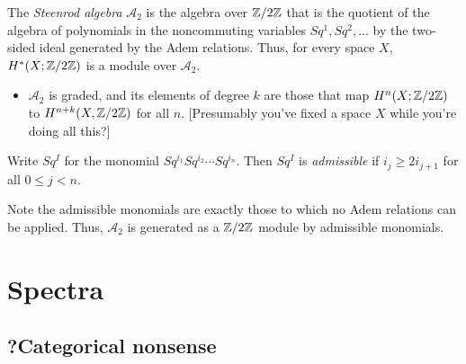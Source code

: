 \documentclass{MetricNotes2023}
\def\inte{\ensuremath\mathbb{Z}}
\def\A{\ensuremath{\mathscr{A}_2}}
\begin{document}
\begin{definition}
The \textit{Steenrod algebra} \(\mathscr{A}_2\) is the algebra over \(\inte/2\inte\) that is the quotient of the algebra of polynomials in the noncommuting variables \(Sq^1, Sq^2, ...\) by the two-sided ideal generated by the Adem relations. Thus, for every space \(X\), \(H^*(X; \inte/2\inte)\) is a module over \(\mathscr A_2\).
\end{definition}

\begin{itemize}
\item \(\mathscr A_2\) is graded, and its elements of degree \(k\) are those that map \(H^n(X; \inte/2\inte)\) to \(H^{n+k}(X, \inte/2\inte)\) for all \(n\). [Presumably you've fixed a space \(X\) while you're doing all this?]
\end{itemize}

\begin{definition}
Write \(Sq^I\) for the monomial \(Sq^{i_1}Sq^{i_2}\cdots Sq^{i_n}\). Then \(Sq^I\) is \textit{admissible} if \(i_j\geq 2i_{j+1}\) for all \(0\leq j < n\). 
\end{definition}

Note the admissible monomials are exactly those to which no Adem relations can be applied. Thus, \(\A\) is generated as a \(\inte/2\inte\) module by admissible monomials. 

\autocite{hatcher}

\section{Spectra}

\subsection{?Categorical nonsense}
\end{document}
